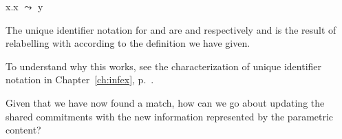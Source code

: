 \begin{shaded}
\begin{ex}
\begin{subex}
\item x.x $\leadsto$ y

                     
\item {}
 
\end{subex} 
   
\end{ex} 
The unique identifier notation for  and  are
 and  respectively and  is the result of
relabelling  with  according to the definition we
have given.
\begin{ex} 
\begin{subex} 
 
\item
 
  \item
 
\end{subex} 
   
\end{ex} 
To understand why this works, see the characterization of unique
identifier notation in Chapter~\ref{ch:infex}, p.~\pageref{pg:unique-identifier-notation}.  


  
  
  

\end{shaded}



Given that we have now found a match, how can we go about updating the
shared commitments with the new information represented by the
parametric content?  %
 
